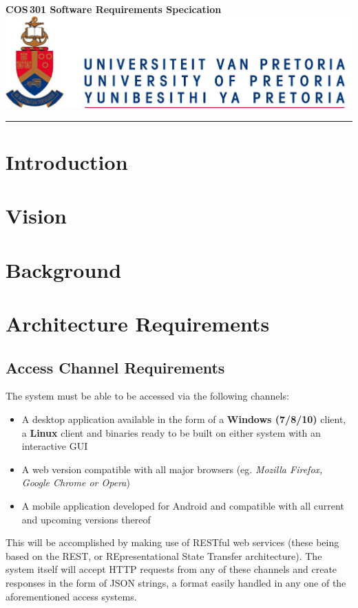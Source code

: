 \documentclass[10pt,a4paper]{exam}
\newcommand\mdsSubject{COS\,301}
\newcommand\mdsLabel{Software Requirements Specication}
\begin{document}
{\LARGE \textsf{\textbf{\mdsSubject{} \mdsLabel}} \hfill \includegraphics[scale=0.5]{UPLogo2012.jpg}
}\\
\hrule


\vspace{0.3in}


\begin{coverpages}
		
\end{coverpages}


\section{Introduction}
\lipsum[1]

\section{Vision}
\lipsum[2]

\section{Background}
\lipsum[3]

\section{Architecture Requirements}
\subsection{Access Channel Requirements}
The system must be able to be accessed via the following channels:
	\begin{itemize}
		\item A desktop application available in the form of a \textbf{Windows (7/8/10)} client, a \textbf{Linux} client and binaries ready to be built on either system with an interactive GUI
		\item A web version compatible with all major browsers (eg. \textit{Mozilla Firefox, Google Chrome or Opera})
		\item A mobile application developed for Android and compatible with all current and upcoming versions thereof
	\end{itemize}
This will be accomplished by making use of RESTful web services (these being based on the REST, or REpresentational State Transfer architecture). The system itself will accept HTTP requests from any of these channels and create responses in the form of JSON strings, a format easily handled in any one of the aforementioned access systems.
\end{document}

